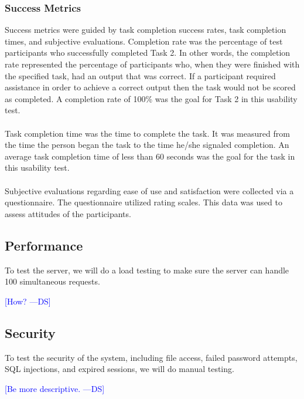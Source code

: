 \documentclass[12pt]{article}
\newcommand{\authornote}[3]{\textcolor{#1}{[#3 ---#2]}}
\newcommand{\authornote}[3]{}
\newcommand{\ds}[1]{\authornote{blue}{DS}{#1}}
\begin{document}
\subsubsection{Success Metrics}
Success metrics were guided by task completion success rates, task completion times, and subjective evaluations.
Completion rate was the percentage of test participants who successfully completed Task 2. In other words, the completion rate represented the percentage of participants who, when they were finished with the specified task, had an output that was correct. If a participant required assistance in order to achieve a correct output then the task would not be scored as completed. A completion rate of 100\% was the goal for Task 2 in this usability test.\\ \\ 
Task completion time was the time to complete the task.  It was measured from the time the person began the task to the time he/she signaled completion. An average task completion time of less than 60 seconds was the goal for the task in this usability test. \\ \\
Subjective evaluations regarding ease of use and satisfaction were collected via a questionnaire.  The questionnaire utilized rating scales. This data was used to assess attitudes of the participants.


\subsection{Performance}
To test the server, we will do a load testing to make sure the server can handle 100 simultaneous requests.

\ds{How?}

\subsection{Security}
To test the security of the system, including file access, failed password attempts, SQL injections, and expired sessions, we will do manual testing.

\ds{Be more descriptive.}
\end{document}
